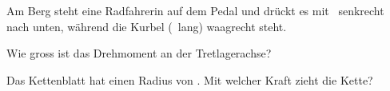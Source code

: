 Am Berg steht eine Radfahrerin auf dem Pedal und drückt es mit \FPO\ senkrecht nach unten, während die Kurbel (\rKO\ lang) waagrecht steht.

\begin{abcliste}
\abc
Wie gross ist das Drehmoment an der Tretlagerachse?

\abc
Das Kettenblatt hat einen Radius von \rBO. Mit welcher Kraft zieht die Kette?
\end{abcliste}
